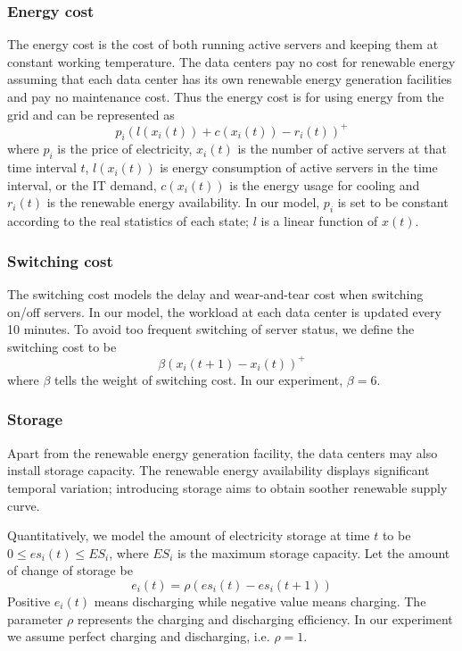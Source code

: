 \documentclass{acm_proc_article-sp}
\begin{document}
\subsubsection{Energy cost}
The energy cost is the cost of both running active servers and keeping them at constant working temperature. The data centers pay no cost for renewable energy assuming that each data center has its own renewable energy generation facilities and pay no maintenance cost. Thus the energy cost is for using energy from the grid and can be represented as
\begin{equation}
p_i(l(x_i(t)) + c(x_i(t)) - r_i(t))^+
\end{equation}  
where $p_i$ is the price of electricity, $x_i(t)$ is the number of active servers at that time interval $t$, $l(x_i(t))$ is energy consumption of active servers in the time interval, or the IT demand, $c(x_i(t))$ is the energy usage for cooling and $r_i(t)$ is the renewable energy availability. In our model, $p_i$ is set to be constant according to the real statistics of each state; $l$ is a linear function of $x(t)$.

\subsubsection{Switching cost}
The switching cost models the delay and wear-and-tear cost when switching on/off servers. In our model, the workload at each data center is updated every 10 minutes. To avoid too frequent switching of server status, we define the switching cost to be
$$\beta(x_i(t+1) - x_i(t))^+$$
where $\beta$ tells the weight of switching cost. In our experiment, $\beta = 6$.

\subsubsection{Storage}
Apart from the renewable energy generation facility, the data centers may also install storage capacity. The renewable energy availability displays significant temporal variation; introducing storage aims to obtain soother renewable supply curve.

Quantitatively, we model the amount of electricity storage at time $t$ to be $0 \leq es_i(t) \leq ES_i$, where $ES_i$ is the maximum storage capacity. Let the amount of change of storage be 
$$e_i(t) = \rho (es_i(t) - es_i(t+1))$$
Positive $e_i(t)$ means discharging while negative value means charging. The parameter $\rho$ represents the charging and discharging efficiency. In our experiment we assume perfect charging and discharging, i.e. $\rho = 1$.
\end{document}
